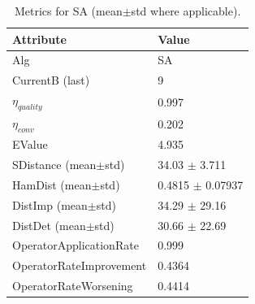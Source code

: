 \begin{table}[t]
\centering
\small
\begin{tabular}{ll}
\toprule
Attribute & Value \\
\midrule
Alg & SA \\
CurrentB (last) & 9 \\
$\eta_{quality}$ & 0.997 \\
$\eta_{conv}$ & 0.202 \\
EValue & 4.935 \\
SDistance (mean$\pm$std) & 34.03 $\pm$ 3.711 \\
HamDist (mean$\pm$std) & 0.4815 $\pm$ 0.07937 \\
DistImp (mean$\pm$std) & 34.29 $\pm$ 29.16 \\
DistDet (mean$\pm$std) & 30.66 $\pm$ 22.69 \\
OperatorApplicationRate & 0.999 \\
OperatorRateImprovement & 0.4364 \\
OperatorRateWorsening & 0.4414 \\
\bottomrule
\end{tabular}
\caption{Metrics for SA (mean$\pm$std where applicable).}
\label{tab:metrics}
\end{table}
